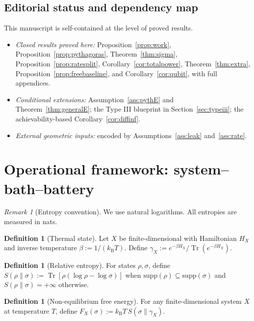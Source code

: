 \documentclass[11pt,a4paper]{article}
\theoremstyle{plain}
\theoremstyle{definition}
\newtheorem{definition}[theorem]{Definition}
\theoremstyle{remark}
\newtheorem{remark}[theorem]{Remark}
\newcommand{\Tr}{\operatorname{Tr}}
\newcommand{\kB}{k_{\mathrm{B}}}
\begin{document}
\subsection{Editorial status and dependency map}

This manuscript is self-contained at the level of proved results.

\begin{itemize}
\item[(S1)] \emph{Closed results proved here:} Proposition~\ref{prop:work},
Proposition~\ref{prop:pythagoras}, Theorem~\ref{thm:sigma},
Proposition~\ref{prop:ratesplit}, Corollary~\ref{cor:totalpower},
Theorem~\ref{thm:extra}, Proposition~\ref{prop:freebaseline}, and
Corollary~\ref{cor:qubit}, with full appendices.
\item[(S2)] \emph{Conditional extensions:} Assumption~\ref{ass:pythE} and
Theorem~\ref{thm:generalE}; the Type III blueprint in
Section~\ref{sec:typeiii}; the achievability-based
Corollary~\ref{cor:diffinf}.
\item[(S3)] \emph{External geometric inputs:} encoded by
Assumptions~\ref{ass:leak} and~\ref{ass:rate}.
\end{itemize}

\section{Operational framework: system--bath--battery}

\begin{remark}[Entropy convention]
We use natural logarithms. All entropies are measured in nats.
\end{remark}

\begin{definition}[Thermal state]
Let $X$ be finite-dimensional with Hamiltonian $H_X$ and inverse temperature
$\beta := 1/(\kB T)$. Define $\gamma_X := e^{-\beta H_X}/\Tr(e^{-\beta H_X})$.
\end{definition}

\begin{definition}[Relative entropy]
For states $\rho, \sigma$, define
$S(\rho\|\sigma) := \Tr[\rho(\log\rho - \log\sigma)]$ when
$\mathrm{supp}(\rho) \subseteq \mathrm{supp}(\sigma)$ and
$S(\rho\|\sigma) = +\infty$ otherwise.
\end{definition}

\begin{definition}[Non-equilibrium free energy]
For any finite-dimensional system $X$ at temperature $T$, define
$F_X(\sigma) := \kB T\, S(\sigma\|\gamma_X)$.
\end{definition}
\end{document}
